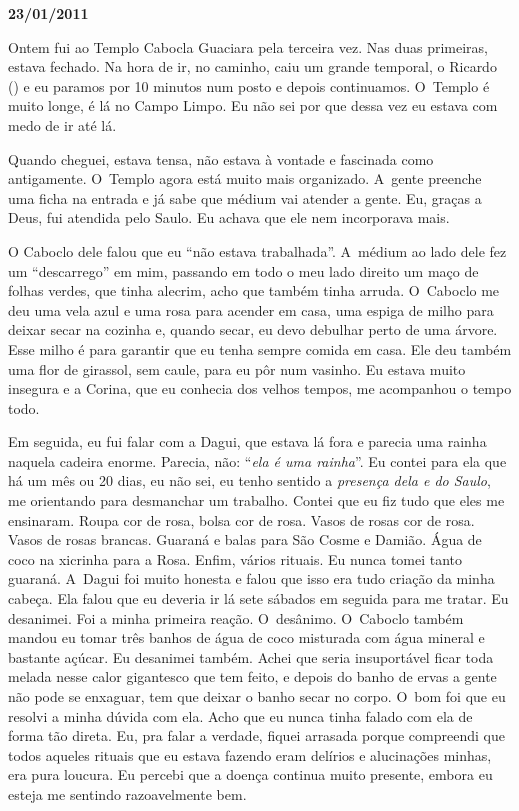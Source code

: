 \begin{flushright}\textbf{23/01/2011}\end{flushright}


Ontem fui ao Templo Cabocla Guaciara pela terceira vez. Nas duas
primeiras, estava fechado. Na hora de ir, no caminho, caiu um grande
temporal, o Ricardo () e eu paramos por 10 minutos num posto e depois
continuamos. O~Templo é muito longe, é lá no Campo Limpo. Eu não sei por
que dessa vez eu estava com medo de ir até lá.

Quando cheguei, estava tensa, não estava à vontade e fascinada como
antigamente. O~Templo agora está muito mais organizado. A~gente preenche
uma ficha na entrada e já sabe que médium vai atender a gente. Eu,
graças a Deus, fui atendida pelo Saulo. Eu achava que ele nem
incorporava mais.

O Caboclo dele falou que eu ``não estava trabalhada''. A~médium ao lado
dele fez um ``descarrego'' em mim, passando em todo o meu lado direito
um maço de folhas verdes, que tinha alecrim, acho que também tinha
arruda. O~Caboclo me deu uma vela azul e uma rosa para acender em casa,
uma espiga de milho para deixar secar na cozinha e, quando secar, eu
devo debulhar perto de uma árvore. Esse milho é para garantir que eu
tenha sempre comida em casa. Ele deu também uma flor de girassol, sem
caule, para eu pôr num vasinho. Eu estava muito insegura e a Corina, que
eu conhecia dos velhos tempos, me acompanhou o tempo todo.

Em seguida, eu fui falar com a Dagui, que estava lá fora e parecia uma
rainha naquela cadeira enorme. Parecia, não: ``\emph{ela é uma rainha}''.
Eu contei para ela que há um mês ou 20 dias, eu não sei, eu tenho
sentido a \emph{presença dela e do Saulo}, me orientando para desmanchar
um trabalho. Contei que eu fiz tudo que eles me ensinaram. Roupa cor de
rosa, bolsa cor de rosa. Vasos de rosas cor de rosa. Vasos de rosas
brancas. Guaraná e balas para São Cosme e Damião. Água de coco na
xicrinha para a Rosa. Enfim, vários rituais. Eu nunca tomei tanto
guaraná. A~Dagui foi muito honesta e falou que isso era tudo criação da
minha cabeça. Ela falou que eu deveria ir lá sete sábados em seguida
para me tratar. Eu desanimei. Foi a minha primeira reação. O~desânimo. O~Caboclo também mandou eu tomar três banhos de água de coco misturada com
água mineral e bastante açúcar. Eu desanimei também. Achei que seria
insuportável ficar toda melada nesse calor gigantesco que tem feito, e
depois do banho de ervas a gente não pode se enxaguar, tem que deixar o
banho secar no corpo. O~bom foi que eu resolvi a minha dúvida com ela.
Acho que eu nunca tinha falado com ela de forma tão direta. Eu, pra
falar a verdade, fiquei arrasada porque compreendi que todos aqueles
rituais que eu estava fazendo eram delírios e alucinações minhas, era
pura loucura. Eu percebi que a doença continua muito presente, embora eu
esteja me sentindo razoavelmente bem.

